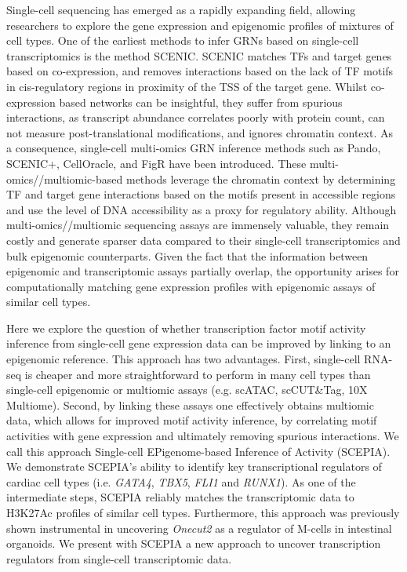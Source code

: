 Single-cell sequencing has emerged as a rapidly expanding field, allowing researchers to explore the gene expression and epigenomic profiles of mixtures of cell types. One of the earliest methods to infer GRNs based on single-cell transcriptomics is the method SCENIC\cite{Aibar_2017}. SCENIC matches TFs and target genes based on co-expression, and removes interactions based on the lack of TF motifs in cis-regulatory regions in proximity of the TSS of the target gene. Whilst co-expression based networks can be insightful, they suffer from spurious interactions, as transcript abundance correlates poorly with protein count\cite{Fortelny2017,Franks2017}, can not measure post-translational modifications, and ignores chromatin context. As a consequence, single-cell multi-omics GRN inference methods such as Pando\cite{Fleck}, SCENIC+\cite{Gonz_lez_Blas_2022}, CellOracle\cite{Kamimoto2023}, and FigR\cite{Kartha2022} have been introduced. These multi-omics//multiomic-based methods leverage the chromatin context by determining TF and target gene interactions based on the motifs present in accessible regions and use the level of DNA accessibility as a proxy for regulatory ability. Although multi-omics//multiomic sequencing assays are immensely valuable, they remain costly and generate sparser data compared to their single-cell transcriptomics and bulk epigenomic counterparts\cite{Li2021}. Given the fact that the information between epigenomic and transcriptomic assays partially overlap\cite{Wang2016,GonzlezRamrez2021}, the opportunity arises for computationally matching gene expression profiles with epigenomic assays of similar cell types. 

Here we explore the question of whether transcription factor motif activity inference from single-cell gene expression data can be improved by linking to an epigenomic reference. This approach has two advantages. First, single-cell RNA-seq is cheaper and more straightforward to perform in many cell types than single-cell epigenomic or multiomic assays (e.g. scATAC, scCUT\&Tag, 10X Multiome). Second, by linking these assays one effectively obtains multiomic data, which allows for improved motif activity inference, by correlating motif activities with gene expression and ultimately removing spurious interactions. We call this approach Single-cell EPigenome-based Inference of Activity (SCEPIA). We demonstrate SCEPIA's ability to identify key transcriptional regulators of cardiac cell types (i.e. \textit{GATA4}, \textit{TBX5}, \textit{FLI1} and \textit{RUNX1}). As one of the intermediate steps, SCEPIA reliably matches the transcriptomic data to H3K27Ac profiles of similar cell types. Furthermore, this approach was previously shown instrumental in uncovering \textit{Onecut2} as a regulator of M-cells in intestinal organoids\cite{LunaVelez2023}. We present with SCEPIA a new approach to uncover transcription regulators from single-cell transcriptomic data. 

